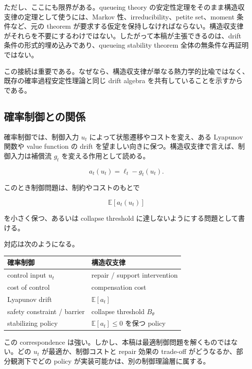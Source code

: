 \documentclass[12pt,a4paper]{article}
\begin{document}
ただし、ここにも限界がある。queueing theory の安定性定理をそのまま構造収支律の定理として使うには、Markov 性、irreducibility、petite set、moment 条件など、元の theorem が要求する仮定を保持しなければならない。構造収支律がそれらを不要にするわけではない。したがって本稿が主張できるのは、drift 条件の形式的埋め込みであり、queueing stability theorem 全体の無条件な再証明ではない。

この接続は重要である。なぜなら、構造収支律が単なる熱力学的比喩ではなく、既存の確率過程安定性理論と同じ drift algebra を共有していることを示すからである。

\subsection{確率制御との関係}\label{ux78baux7387ux5236ux5fa1ux3068ux306eux95a2ux4fc2}

確率制御では、制御入力 \(u_{t}\) によって状態遷移やコストを変え、ある Lyapunov 関数や value function の drift を望ましい向きに保つ。構造収支律で言えば、制御入力は補償流 \(g_{t}\) を変える作用として読める。

\[
a_{t}(u_{t})=\ell_{t}-g_{t}(u_{t}).
\]

このとき制御問題は、制約やコストのもとで

\[
\mathbb E[a_{t}(u_{t})]
\]

を小さく保つ、あるいは collapse threshold に達しないようにする問題として書ける。

対応は次のようになる。

{\def\LTcaptype{table} %
\begin{longtable}[]{@{}ll@{}}
\toprule\noalign{}
確率制御 & 構造収支律 \\
\midrule\noalign{}
\endhead
\bottomrule\noalign{}
\endlastfoot
control input \(u_t\) & repair / support intervention \\
cost of control & compensation cost \\
Lyapunov drift & \(\mathbb E[a_t]\) \\
safety constraint / barrier & collapse threshold \(B_\theta\) \\
stabilizing policy & \(\mathbb E[a_t]\le 0\) を保つ policy \\
\end{longtable}
}

この correspondence は強い。しかし、本稿は最適制御問題を解くものではない。どの \(u_{t}\) が最適か、制御コストと repair 効果の trade-off がどうなるか、部分観測下でどの policy が実装可能かは、別の制御理論層に属する。
\end{document}
